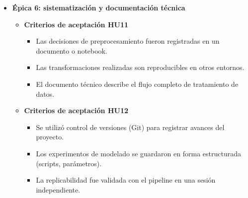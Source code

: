 \documentclass[
11pt, %
]{charter}
\begin{document}
\begin{itemize}
  \item \textbf{Épica 6: sistematización y documentación técnica}
    \begin{itemize}
      \item \textbf{Criterios de aceptación HU11}
      \begin{itemize}
        \item Las decisiones de preprocesamiento fueron registradas en un documento o notebook.
        \item Las transformaciones realizadas son reproducibles en otros entornos.
        \item El documento técnico describe el flujo completo de tratamiento de datos.
      \end{itemize}

      \item \textbf{Criterios de aceptación HU12}
      \begin{itemize}
        \item Se utilizó control de versiones (Git) para registrar avances del proyecto.
        \item Los experimentos de modelado se guardaron en forma estructurada (scripts, parámetros).
        \item La replicabilidad fue validada con el pipeline en una sesión independiente.
      \end{itemize}
    \end{itemize}




\end{itemize}
\end{document}
